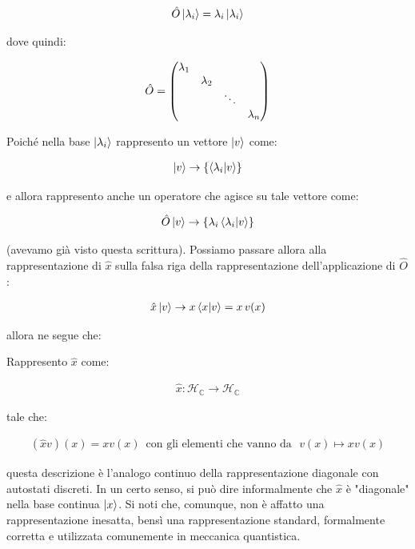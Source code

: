 \begin{align*}
	\hat{O} \ket{\lambda_i} = \lambda_i \ket{\lambda_i}
\end{align*}

	dove quindi:
	
\begin{align*}
	\hat{O} = \mqty( \lambda_1 &  & &  \\  & \lambda_2 &  &  \\  &  & \ddots &  \\  &  &  & \lambda_n)
\end{align*}

	Poiché nella base $\ket{\lambda_i}$ rappresento un vettore $\ket{v}$ come:
	
\begin{align*}
	\ket{v} \to \{ \braket{\lambda_i}{v} \}
\end{align*}

	e allora rappresento anche un operatore che agisce su tale vettore come:
	
\begin{align*}
	\hat{O} \ket{v} \to \{\lambda_i \braket{\lambda_i}{v} \}
\end{align*}

	(avevamo già visto questa scrittura). Possiamo passare allora alla rappresentazione di $\hat{x}$ sulla falsa riga della rappresentazione dell'applicazione di $\hat{O}$:

\begin{align*}
	\hat{x} \ket{v} \to x \braket{x}{v}  =  x \, v(x)  
\end{align*}

	allora ne segue che:
	
\begin{mydef}
	Rappresento $\hat{x}$ come:
	
\begin{align*}
	\hat{x} : \mathcal{H}_{\mathbb{C}} \to \mathcal{H}_{\mathbb{C}}
\end{align*}

	tale che:
	
\begin{align*}
	(\hat{x}v)(x) = xv(x) \,\,\, \text{con gli elementi che vanno da } \,\, v(x) \mapsto xv(x)
\end{align*}
\end{mydef}

	questa descrizione è l'analogo continuo della rappresentazione diagonale con autostati discreti. In un certo senso, si può dire informalmente che $\hat{x}$ è "diagonale" nella base continua $\ket{x}$. Si noti che, comunque, non è affatto una rappresentazione inesatta, bensì una rappresentazione standard, formalmente corretta e utilizzata comunemente in meccanica quantistica.

